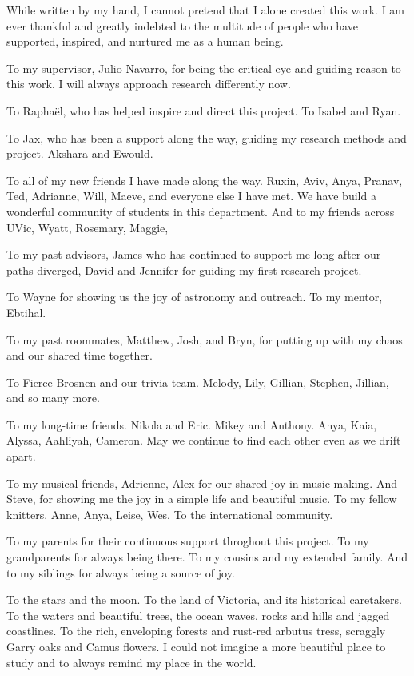 While written by my hand, I cannot pretend that I alone created this
work. I am ever thankful and greatly indebted to the multitude of people
who have supported, inspired, and nurtured me as a human being.

To my supervisor, Julio Navarro, for being the critical eye and guiding
reason to this work. I will always approach research differently now.

To Raphaël, who has helped inspire and direct this project. To Isabel
and Ryan.

To Jax, who has been a support along the way, guiding my research
methods and project. Akshara and Ewould.

To all of my new friends I have made along the way. Ruxin, Aviv, Anya,
Pranav, Ted, Adrianne, Will, Maeve, and everyone else I have met. We
have build a wonderful community of students in this department. And to
my friends across UVic, Wyatt, Rosemary, Maggie,

To my past advisors, James who has continued to support me long after
our paths diverged, David and Jennifer for guiding my first research
project.

To Wayne for showing us the joy of astronomy and outreach. To my mentor,
Ebtihal.

To my past roommates, Matthew, Josh, and Bryn, for putting up with my
chaos and our shared time together.

To Fierce Brosnen and our trivia team. Melody, Lily, Gillian, Stephen,
Jillian, and so many more.

To my long-time friends. Nikola and Eric. Mikey and Anthony. Anya, Kaia,
Alyssa, Aahliyah, Cameron. May we continue to find each other even as we
drift apart.

To my musical friends, Adrienne, Alex for our shared joy in music
making. And Steve, for showing me the joy in a simple life and beautiful
music. To my fellow knitters. Anne, Anya, Leise, Wes. To the
international community.

To my parents for their continuous support throghout this project. To my
grandparents for always being there. To my cousins and my extended
family. And to my siblings for always being a source of joy.

To the stars and the moon. To the land of Victoria, and its historical
caretakers. To the waters and beautiful trees, the ocean waves, rocks
and hills and jagged coastlines. To the rich, enveloping forests and
rust-red arbutus tress, scraggly Garry oaks and Camus flowers. I could
not imagine a more beautiful place to study and to always remind my
place in the world.
